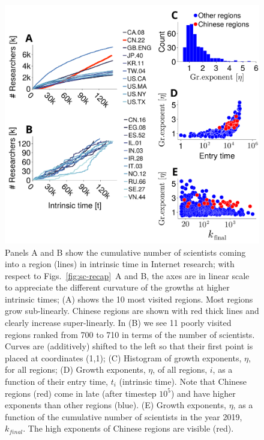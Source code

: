 \documentclass[draft,final]{vutinfth} %
\begin{document}

\begin{figure}[t] 
\centering
\includegraphics[width=0.8\linewidth]{figures_csf/fig3-internet.pdf}
    \caption{Panels A and B show the cumulative number of scientists coming into a region (lines) in intrinsic time in Internet research; 
        with respect to Figs.~\ref{fig:sc-recap}~A and B, the axes are in linear scale to appreciate the different curvature of the growths at higher intrinsic times;
    (A) shows the 10 most visited regions. Most regions grow sub-linearly. Chinese regions are shown with red thick lines and clearly increase super-linearly.
    In (B) we see 11 poorly visited regions ranked from 700 to 710 in terms of the number of scientists. Curves are (additively) shifted to the left so that their first point is placed at coordinates (1,1);
    (C) Histogram of growth exponents, $\eta$, for all regions;
    (D) Growth exponents, $\eta$, of all regions, $i$, as a function of their entry time, $t_i$ (intrinsic time). Note that Chinese regions (red) come in late (after timestep $10^5$) and have higher exponents than other regions (blue).
    (E) Growth exponents, $\eta$, as a function of the cumulative number of scientists in the year 2019, $k_{final}$. The high exponents of Chinese regions are visible (red).
    }
\label{fig:internet-intrinsic_growth}
\end{figure}
\end{document}
